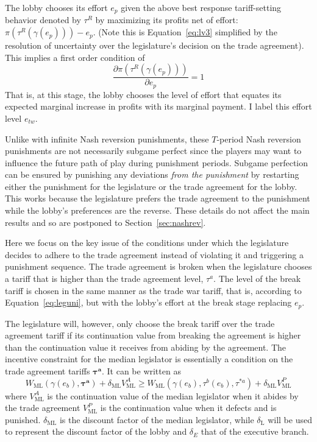 \documentclass[authoryear, review]{elsarticle}
\newcommand{\bta}{\bm{\tau^a}}
\newcommand{\ga}{\gamma}
\newcommand{\de}{\delta}
\begin{document}
The lobby chooses its effort $e_p$ given the above best response tariff-setting behavior denoted by $\tau^R$ by maximizing its profits net of effort: $\pi\left(\tau^R\left(\ga\left(e_{p}\right)\right)\right) - e_{p}$. (Note this is Equation~\ref{eq:lv3} simplified by the resolution of uncertainty over the legislature's decision on the trade agreement). This implies a first order condition of
\begin{equation}
	\frac{\partial \pi(\tau^R(\ga(e_p)))}{\partial e_{p}} = 1
  \label{eq:lobtw}
\end{equation}
That is, at this stage, the lobby chooses the level of effort that equates its expected marginal increase in profits with its marginal payment. I label this effort level $e_{tw}$.

Unlike with infinite Nash reversion punishments, these $T$-period Nash reversion punishments are not necessarily subgame perfect since the players may want to influence the future path of play during punishment periods. Subgame perfection can be ensured by punishing any deviations \textit{from the punishment} by restarting either the punishment for the legislature or the trade agreement for the lobby. This works because the legislature prefers the trade agreement to the punishment while the lobby's preferences are the reverse. These details do not affect the main results and so are postponed to Section~\ref{sec:nashrev}.

Here we focus on the key issue of the conditions under which the legislature decides to adhere to the trade agreement instead of violating it and triggering a punishment sequence. The trade agreement is broken when the legislature chooses a tariff that is higher than the trade agreement level, $\tau^a$. The level of the break tariff is chosen in the same manner as the trade war tariff, that is, according to Equation~\ref{eq:leguni}, but with the lobby's effort at the break stage replacing $e_p$.

The legislature will, however, only choose the break tariff over the trade agreement tariff if its continuation value from breaking the agreement is higher than the continuation value it receives from abiding by the agreement. The incentive constraint for the median legislator is essentially a condition on the trade agreement tariffs $\bta$. It can be written as
\[
  W_\text{ML}(\ga(e_b),\bta) + \de_\text{ML} V^A_\text{ML} \geq W_\text{ML}(\ga(e_b),\tau^b(e_b),\tau^{*a}) + \de_\text{ML} V^P_\text{ML}
\]
where $V^A_\text{ML}$ is the continuation value of the median legislator when it abides by the trade agreement $V^P_\text{ML}$ is the continuation value when it defects and is punished. $\de_\text{ML}$ is the discount factor of the median legislator, while $\de_\text{L}$ will be used to represent the discount factor of the lobby and $\de_E$ that of the executive branch.
\end{document}
